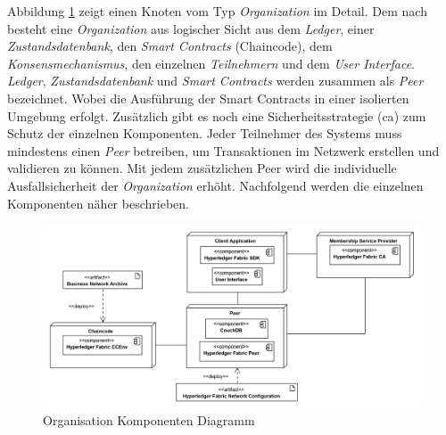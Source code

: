 Abbildung \ref{fig:organization-component-diagram} zeigt einen Knoten vom Typ \textit{Organization} im Detail. Dem nach besteht eine \textit{Organization} aus logischer Sicht aus dem \textit{Ledger}, einer \textit{Zustandsdatenbank}, den \textit{Smart Contracts} (Chaincode), dem \textit{Konsensmechanismus}, den einzelnen \textit{Teilnehmern} und dem \textit{User Interface}. \textit{Ledger}, \textit{Zustandsdatenbank} und \textit{Smart Contracts} werden zusammen als \textit{Peer} bezeichnet. Wobei die Ausführung der Smart Contracts in einer isolierten Umgebung erfolgt. Zusätzlich gibt es noch eine Sicherheitsstrategie (\ac{ca}) zum Schutz der einzelnen Komponenten. Jeder Teilnehmer des Systems muss mindestens einen \textit{Peer} betreiben, um Transaktionen im Netzwerk erstellen und validieren zu können. Mit jedem zusätzlichen Peer wird die individuelle Ausfallsicherheit der \textit{Organization} erhöht. Nachfolgend werden die einzelnen Komponenten näher beschrieben.

\begin{figure}[H]
	\centering
	\includegraphics[width=1\linewidth]{pictures/organization-component-diagram}
	\caption[Organisation Komponenten Diagramm]{Organisation Komponenten Diagramm}
	\label{fig:organization-component-diagram}
\end{figure}

